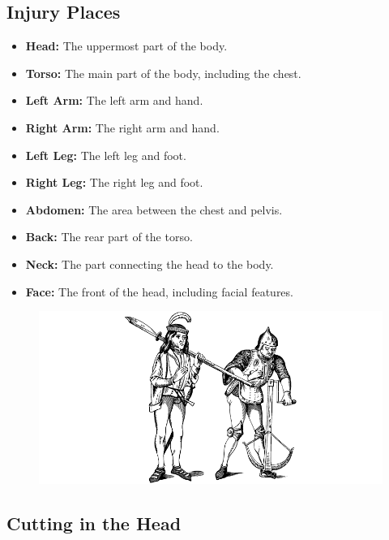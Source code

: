 \documentclass[12pt]{book}  %
\begin{document}
\subsection{Injury Places}

\begin{itemize}
    \item \textbf{Head:} The uppermost part of the body.
    \item \textbf{Torso:} The main part of the body, including the chest.
    \item \textbf{Left Arm:} The left arm and hand.
    \item \textbf{Right Arm:} The right arm and hand.
    \item \textbf{Left Leg:} The left leg and foot.
    \item \textbf{Right Leg:} The right leg and foot.
    \item \textbf{Abdomen:} The area between the chest and pelvis.
    \item \textbf{Back:} The rear part of the torso.
    \item \textbf{Neck:} The part connecting the head to the body.
    \item \textbf{Face:} The front of the head, including facial features.
\end{itemize}

\begin{figure}[h]
    \centering
    \includegraphics[width=\textwidth]{./images/combat03.pdf}
\end{figure}

\subsection{Cutting in the Head}
\end{document}
